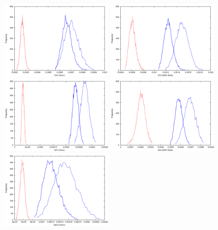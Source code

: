 \documentclass[useAMS,usenatbib]{mn2e}
\begin{document}
\begin{figure}
\includegraphics[width=0.48\textwidth]{figures/orion_O_rpeffect_simpler.png}
\includegraphics[width=0.48\textwidth]{figures/ngc6543_o_rpeffect_simpler.png}
\includegraphics[width=0.48\textwidth]{figures/orion_N_rpeffect_simpler.png}
\includegraphics[width=0.48\textwidth]{figures/ngc6543_n_rpeffect_simpler.png}
\includegraphics[width=0.48\textwidth]{figures/orion_Ne_rpeffect_simpler.png}

\end{figure}
\end{document}
